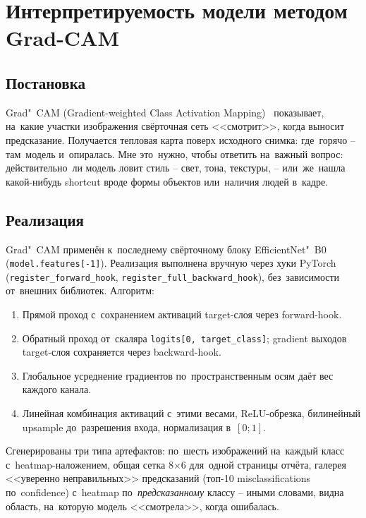 \documentclass[a4paper,12pt]{diplom}
\begin{document}

\section{Интерпретируемость модели методом Grad-CAM}
\label{sec:gradcam}

\subsection{Постановка}

Grad"~CAM (Gradient-weighted Class Activation Mapping)~\cite{Selvaraju:2017} показывает, на~какие участки изображения свёрточная сеть <<смотрит>>, когда выносит предсказание. Получается тепловая карта поверх исходного снимка: где~горячо -- там~модель и~опиралась. Мне это~нужно, чтобы ответить на~важный вопрос: действительно~ли модель ловит стиль -- свет, тона, текстуры, -- или~же~нашла какой-нибудь shortcut вроде формы объектов или~наличия людей в~кадре.

\subsection{Реализация}

Grad"~CAM применён к~последнему свёрточному блоку EfficientNet"~B0 (\verb|model.features[-1]|). Реализация выполнена вручную через хуки PyTorch (\verb|register_forward_hook|, \verb|register_full_backward_hook|), без~зависимости от~внешних библиотек. Алгоритм:

\begin{enumerate}[label=\arabic{enumi})]
\item Прямой проход с~сохранением активаций target-слоя через forward-hook.
\item Обратный проход от~скаляра \verb|logits[0, target_class]|; gradient выходов target-слоя сохраняется через backward-hook.
\item Глобальное усреднение градиентов по~пространственным осям даёт вес каждого канала.
\item Линейная комбинация активаций с~этими весами, ReLU-обрезка, билинейный upsample до~разрешения входа, нормализация в~$[0;1]$.
\end{enumerate}

Сгенерированы три типа артефактов: по~шесть изображений на~каждый класс с~heatmap-наложением, общая сетка 8$\times$6 для~одной страницы отчёта, галерея <<уверенно неправильных>> предсказаний (топ-10 misclassifications по~confidence) с~heatmap по~\emph{предсказанному} классу -- иными словами, видна область, на~которую модель <<смотрела>>, когда ошибалась.
\end{document}
